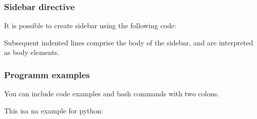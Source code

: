 \begin{sphinxVerbatim}[commandchars=\\\{\}]
      
\end{sphinxVerbatim}


\subsubsection{Sidebar directive}
\label{\detokenize{lesson/doc/rst:sidebar-directive}}
It is possible to create sidebar using the following code:

\begin{sphinxVerbatim}[commandchars=\\\{\}]
   
       

       
          
       
\end{sphinxVerbatim}

\begin{sphinxShadowBox}

Subsequent indented lines comprise
the body of the sidebar, and are
interpreted as body elements.
\end{sphinxShadowBox}


\subsubsection{Programm examples}
\label{\detokenize{lesson/doc/rst:programm-examples}}
You can include code examples and bash commands with two colons.

This isa na example for python:

\begin{sphinxVerbatim}[commandchars=\\\{\}]
 
\end{sphinxVerbatim}

